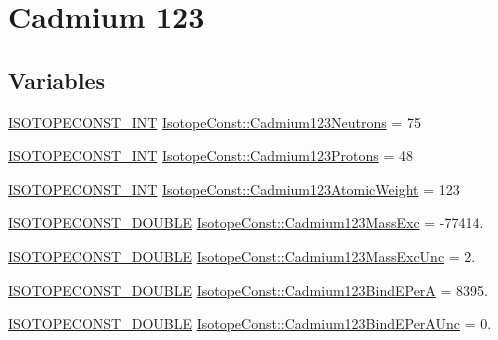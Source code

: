 \hypertarget{group___isotope_const-_cadmium-_cd123}{}\section{Cadmium 123}
\label{group___isotope_const-_cadmium-_cd123}
\subsection*{Variables}
\begin{DoxyCompactItemize}
\item 
\mbox{\hyperlink{group___isotope_const-_macros_ga5f18360b3e99483a35c32d789e62621c}{I\+S\+O\+T\+O\+P\+E\+C\+O\+N\+S\+T\+\_\+\+I\+NT}} \mbox{\hyperlink{group___isotope_const-_cadmium-_cd123_gab0da70a93f2d2d70bcf7d78ece872eaf}{Isotope\+Const\+::\+Cadmium123\+Neutrons}} = 75
\item 
\mbox{\hyperlink{group___isotope_const-_macros_ga5f18360b3e99483a35c32d789e62621c}{I\+S\+O\+T\+O\+P\+E\+C\+O\+N\+S\+T\+\_\+\+I\+NT}} \mbox{\hyperlink{group___isotope_const-_cadmium-_cd123_gae5c7774e09cbbec7777173e59c6b6498}{Isotope\+Const\+::\+Cadmium123\+Protons}} = 48
\item 
\mbox{\hyperlink{group___isotope_const-_macros_ga5f18360b3e99483a35c32d789e62621c}{I\+S\+O\+T\+O\+P\+E\+C\+O\+N\+S\+T\+\_\+\+I\+NT}} \mbox{\hyperlink{group___isotope_const-_cadmium-_cd123_ga30479b53035199a802d0f339c047764f}{Isotope\+Const\+::\+Cadmium123\+Atomic\+Weight}} = 123
\item 
\mbox{\hyperlink{group___isotope_const-_macros_ga8f45a7272ce02c0b4c65c44636ed719a}{I\+S\+O\+T\+O\+P\+E\+C\+O\+N\+S\+T\+\_\+\+D\+O\+U\+B\+LE}} \mbox{\hyperlink{group___isotope_const-_cadmium-_cd123_gaed08770065fd674dfc8f8435b1de6938}{Isotope\+Const\+::\+Cadmium123\+Mass\+Exc}} = -\/77414.
\item 
\mbox{\hyperlink{group___isotope_const-_macros_ga8f45a7272ce02c0b4c65c44636ed719a}{I\+S\+O\+T\+O\+P\+E\+C\+O\+N\+S\+T\+\_\+\+D\+O\+U\+B\+LE}} \mbox{\hyperlink{group___isotope_const-_cadmium-_cd123_gaf98375641bffeb3b1177daa3f74dc82a}{Isotope\+Const\+::\+Cadmium123\+Mass\+Exc\+Unc}} = 2.
\item 
\mbox{\hyperlink{group___isotope_const-_macros_ga8f45a7272ce02c0b4c65c44636ed719a}{I\+S\+O\+T\+O\+P\+E\+C\+O\+N\+S\+T\+\_\+\+D\+O\+U\+B\+LE}} \mbox{\hyperlink{group___isotope_const-_cadmium-_cd123_gac289db3f0b5862894354a5a6efd6e20f}{Isotope\+Const\+::\+Cadmium123\+Bind\+E\+PerA}} = 8395.
\item 
\mbox{\hyperlink{group___isotope_const-_macros_ga8f45a7272ce02c0b4c65c44636ed719a}{I\+S\+O\+T\+O\+P\+E\+C\+O\+N\+S\+T\+\_\+\+D\+O\+U\+B\+LE}} \mbox{\hyperlink{group___isotope_const-_cadmium-_cd123_gae94b338171f0a0257fc1f898e06124f4}{Isotope\+Const\+::\+Cadmium123\+Bind\+E\+Per\+A\+Unc}} = 0.

\end{DoxyCompactItemize}
